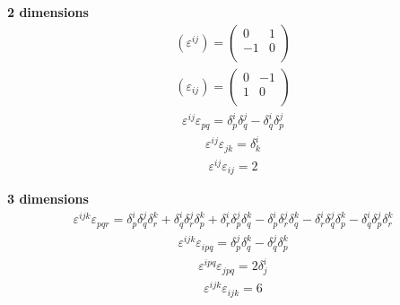 \documentclass[a4paper; 11pt]{article}
\begin{document}
\newpage
\textbf{2 dimensions}
\\
\begin{align}
(\varepsilon^{ij})=
\left(
\begin{array}{cc}
 0 & 1 \\
  -1 & 0 \\
\end{array}
\right)
\end{align}
\begin{align}
(\varepsilon_{ij})=
\left(
\begin{array}{cc}
 0 & -1 \\
  1 & 0 \\
\end{array}
\right)
\end{align}
\begin{align}
\varepsilon^{ij}\varepsilon_{pq} = \delta^i_p \delta^j_q - \delta^i_q \delta^j_p
\end{align}
\begin{align}
\varepsilon^{ij}\varepsilon_{jk} = \delta^i_k
\end{align}
\begin{align}
\varepsilon^{ij}\varepsilon_{ij} = 2
\end{align}



\newpage
\textbf{3 dimensions}
\\
\begin{align}
\varepsilon^{ijk}\varepsilon_{pqr} = 
\delta^i_p \delta^j_q \delta^k_r
+\delta^i_q \delta^j_r \delta^k_p
+\delta^i_r \delta^j_p \delta^k_q
-\delta^i_p \delta^j_r \delta^k_q
-\delta^i_r \delta^j_q \delta^k_p
-\delta^i_q \delta^j_p \delta^k_r
\end{align}
\begin{align}
\varepsilon^{ijk}\varepsilon_{ipq} = \delta^j_p \delta^k_q - \delta^j_q \delta^k_p
\end{align}
\begin{align}
\varepsilon^{ipq}\varepsilon_{jpq} =2 \delta^i_j
\end{align}
\begin{align}
\varepsilon^{ijk}\varepsilon_{ijk} = 6
\end{align}

\begin{comment}
\newpage
\textbf{4 dimensions}
\\
\begin{align}
\varepsilon^{ipqr}\varepsilon_{jpqr} =6 \delta^i_j
\end{align}
\begin{align}
\varepsilon^{ijkl}\varepsilon_{ijkl} = 24
\end{align}

\end{comment}
\end{document}
